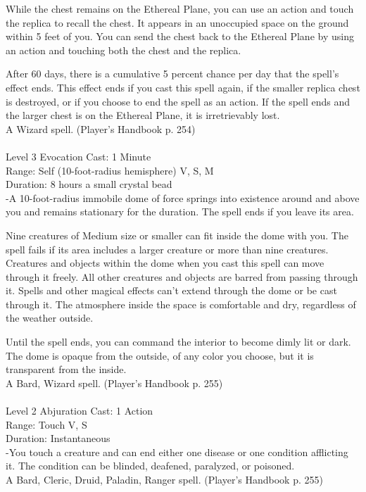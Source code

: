\documentclass[10pt,twocolumn]{report}
\begin{document}
While the chest remains on the Ethereal Plane, you can use an action and touch the replica to recall the chest. It appears in an unoccupied space on the ground within 5 feet of you. You can send the chest back to the Ethereal Plane by using an action and touching both the chest and the replica.

After 60 days, there is a cumulative 5 percent chance per day that the spell’s effect ends. This effect ends if you cast this spell again, if the smaller replica chest is destroyed, or if you choose to end the spell as an action. If the spell ends and the larger chest is on the Ethereal Plane, it is irretrievably lost.\\
A Wizard spell. (Player's Handbook p. 254) \\


 \\
Level 3 \quad Evocation \quad Cast: 1 Minute\\
Range: Self (10-foot-radius hemisphere) \quad V, S, M\\
Duration: 8 hours \quad a small crystal bead\\
-A 10-foot-radius immobile dome of force springs into existence around and above you and remains stationary for the duration. The spell ends if you leave its area.

Nine creatures of Medium size or smaller can fit inside the dome with you. The spell fails if its area includes a larger creature or more than nine creatures. Creatures and objects within the dome when you cast this spell can move through it freely. All other creatures and objects are barred from passing through it. Spells and other magical effects can’t extend through the dome or be cast through it. The atmosphere inside the space is comfortable and dry, regardless of the weather outside.

Until the spell ends, you can command the interior to become dimly lit or dark. The dome is opaque from the outside, of any color you choose, but it is transparent from the inside.\\
A Bard, Wizard spell. (Player's Handbook p. 255) \\


 \\
Level 2 \quad Abjuration \quad Cast: 1 Action\\
Range: Touch \quad V, S\\
Duration: Instantaneous \quad \\
-You touch a creature and can end either one disease or one condition afflicting it. The condition can be blinded, deafened, paralyzed, or poisoned.\\
A Bard, Cleric, Druid, Paladin, Ranger spell. (Player's Handbook p. 255) \\
\end{document}
